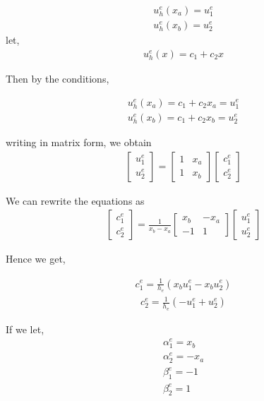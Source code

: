 \begin{eqnarray}
	u_h^{e} (x_a) = u_1^{e} \\
	u_h^{e} (x_b) = u_2^{e}  
\end{eqnarray}
let,
\begin{eqnarray}
	u_h^{e} (x) = c_1 + c_2 x
\end{eqnarray}

Then by the conditions,

\begin{eqnarray}
	u_h^{e} (x_a) = c_1 + c_2 x_a = u_1^{e}\\
	u_h^{e} (x_b) = c_1 + c_2 x_b = u_2^{e}
\end{eqnarray}

writing in matrix form, we obtain
\begin{eqnarray}
\begin{bmatrix}
	u_1^{e}\\
	u_2^{e}
\end{bmatrix}
=
\begin{bmatrix}
	1 & x_a\\
	1 & x_b
\end{bmatrix}
\begin{bmatrix}
	c_1^{e}\\
	c_2^{e}
\end{bmatrix}
\end{eqnarray}

We can rewrite the equations as 
\begin{eqnarray}
	\begin{bmatrix}
		c_1^{e}\\
		c_2^{e}
	\end{bmatrix}
	= \frac{1}{x_b - x_a}
	\begin{bmatrix}
		x_b & -x_a\\
		-1 & 1
	\end{bmatrix}
	\begin{bmatrix}
		u_1^{e}\\
		u_2^{e}
	\end{bmatrix}
\end{eqnarray}

Hence we get,

\begin{eqnarray}
	c_1^{e} = \frac{1}{h_e} (x_bu_1^e - x_bu_2^e)
\end{eqnarray}
\begin{eqnarray}
	c_2^{e} = \frac{1}{h_e} (-u_1^e + u_2^e)
\end{eqnarray}

If we let,
\begin{eqnarray*}
	\alpha_1^e = x_b\\
	\alpha_2^e = - x_a\\
	\beta_1^e = -1 \\
	\beta_2^e = 1	
\end{eqnarray*}

